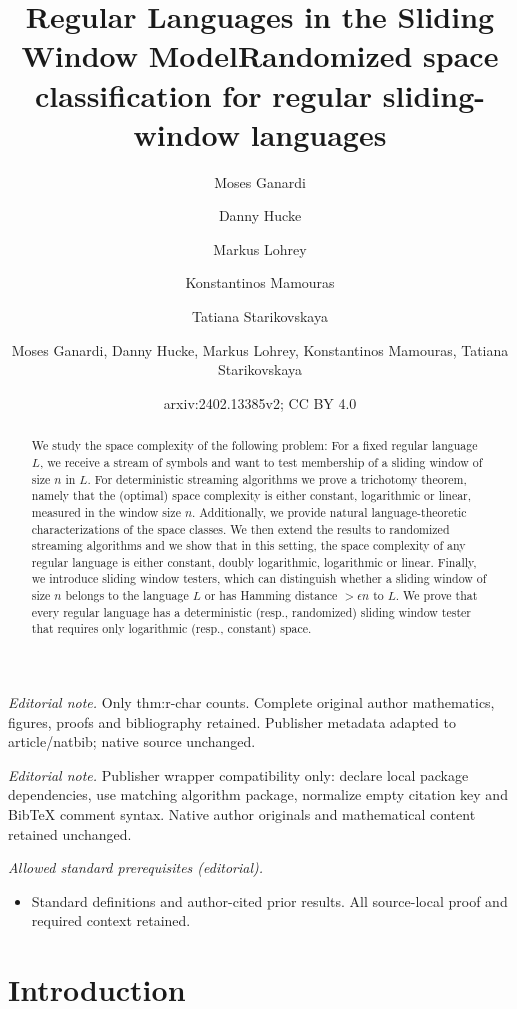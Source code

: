 \documentclass{article}\usepackage[a4paper,margin=20mm]{geometry}
\title{Regular Languages in the Sliding Window Model}
\author{Moses Ganardi \and Danny Hucke \and Markus Lohrey \and Konstantinos Mamouras \and Tatiana Starikovskaya}\date{}
\title{Randomized space classification for regular sliding-window languages}
\author{Moses Ganardi, Danny Hucke, Markus Lohrey, Konstantinos Mamouras, Tatiana Starikovskaya}
\date{arxiv:2402.13385v2; CC BY 4.0}
\begin{document}
\maketitle
\noindent\textit{Editorial note.} Only thm:r-char counts. Complete original author mathematics, figures, proofs and bibliography retained. Publisher metadata adapted to article/natbib; native source unchanged.\par\medskip
\noindent\textit{Editorial note.} Publisher wrapper compatibility only: declare local package dependencies, use matching algorithm package, normalize empty citation key and BibTeX comment syntax. Native author originals and mathematical content retained unchanged.\par\medskip
\noindent\textit{Allowed standard prerequisites (editorial).}\begin{itemize}
\item Standard definitions and author-cited prior results. All source-local proof and required context retained.
\end{itemize}\medskip
\maketitle

\begin{abstract}
We study the space complexity of the following problem:
For a fixed regular language $L$, we receive a stream of symbols and want to test membership of a sliding window of size $n$ in $L$.
For deterministic streaming algorithms we prove a trichotomy theorem,
namely that the (optimal) space complexity is either constant, logarithmic or linear,
measured in the window size $n$.
Additionally, we provide natural language-theoretic characterizations
of the space classes.
We then extend the results to randomized streaming algorithms and we show that in this setting, the space complexity of any regular language is either constant, doubly logarithmic, logarithmic or linear.
Finally, we introduce sliding window testers, which can distinguish
whether a sliding window of size $n$ belongs to the language $L$ or
has Hamming distance $> \epsilon n$ to $L$.
We prove that every regular language has a deterministic (resp., randomized) sliding window tester
that requires only logarithmic (resp., constant) space.
\end{abstract}






\section{Introduction}
\end{document}

